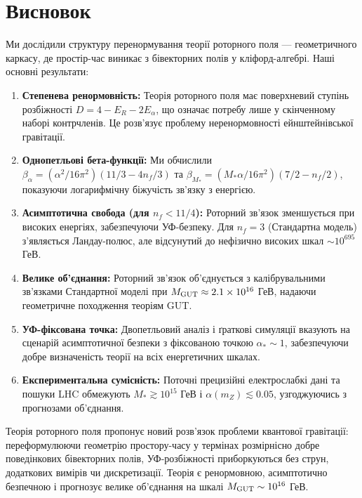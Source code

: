 \documentclass[11pt,a4paper]{article}
\numberwithin{equation}{section}
\theoremstyle{plain}
\theoremstyle{definition}
\theoremstyle{remark}
\begin{document}
\section{Висновок}\label{sec:conclusion}

Ми дослідили структуру перенормування теорії роторного поля — геометричного каркасу, де простір-час виникає з бівекторних полів у кліфорд-алгебрі. Наші основні результати:

\begin{enumerate}[leftmargin=*,itemsep=3pt]
  \item \textbf{Степенева ренормовність:} Теорія роторного поля має поверхневий ступінь розбіжності $D=4-E_R-2E_\alpha$, що означає потребу лише у скінченному наборі контрчленів. Це розв'язує проблему неренормовності ейнштейнівської гравітації.

  \item \textbf{Однопетльові бета-функції:} Ми обчислили $\beta_\alpha = (\alpha^2/16\pi^2)(11/3 - 4n_f/3)$ та $\beta_{M_*} = (M_*\alpha/16\pi^2)(7/2 - n_f/2)$, показуючи логарифмічну біжучість зв'язку з енергією.

  \item \textbf{Асимптотична свобода (для $n_f<11/4$):} Роторний зв'язок зменшується при високих енергіях, забезпечуючи УФ-безпеку. Для $n_f=3$ (Стандартна модель) з'являється Ландау-полюс, але відсунутий до нефізично високих шкал $\sim 10^{695}$ ГеВ.

  \item \textbf{Велике об'єднання:} Роторний зв'язок об'єднується з калібрувальними зв'язками Стандартної моделі при $M_{\rm GUT}\approx 2{.}1\times 10^{16}$ ГеВ, надаючи геометричне походження теоріям GUT.

  \item \textbf{УФ-фіксована точка:} Двопетльовий аналіз і ґраткові симуляції вказують на сценарій асимптотичної безпеки з фіксованою точкою $\alpha_*\sim 1$, забезпечуючи добре визначеність теорії на всіх енергетичних шкалах.

  \item \textbf{Експериментальна сумісність:} Поточні прецизійні електрослабкі дані та пошуки LHC обмежують $M_*\gtrsim 10^{15}$ ГеВ і $\alpha(m_Z)\lesssim 0{.}05$, узгоджуючись з прогнозами об'єднання.
\end{enumerate}

Теорія роторного поля пропонує новий розв'язок проблеми квантової гравітації: переформулюючи геометрію простору-часу у термінах розмірнісно добре поведінкових бівекторних полів, УФ-розбіжності приборкуються без струн, додаткових вимірів чи дискретизації. Теорія є ренормовною, асимптотично безпечною і прогнозує велике об'єднання на шкалі $M_{\rm GUT}\sim 10^{16}$ ГеВ.
\end{document}
